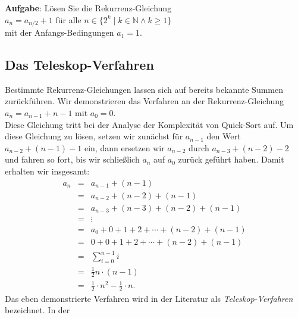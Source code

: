 \noindent
\textbf{Aufgabe}:  Lösen Sie die Rekurrenz-Gleichung \\[0.2cm]
\hspace*{1.3cm} $a_{n} = a_{n/2} + 1$ \quad für alle $n \in \{ 2^k \mid k \in \mathbb{N} \wedge k \geq 1\}$\\[0.2cm]
mit der Anfangs-Bedingungen $a_1 = 1$.
\vspace*{0.3cm}


\subsection{Das Teleskop-Verfahren}
Bestimmte Rekurrenz-Gleichungen lassen sich auf bereits bekannte Summen zurückführen.  Wir demonstrieren
das Verfahren an der Rekurrenz-Gleichung \\[0.2cm]
\hspace*{1.3cm} $a_n = a_{n-1} + n - 1$ \quad mit $a_0 = 0$. 
\\[0.2cm]
Diese Gleichung tritt bei der Analyse der Komplexität von Quick-Sort auf.
Um diese Gleichung zu lösen, setzen wir zunächst für $a_{n-1}$ den Wert $a_{n-2} + (n-1) - 1$ ein, dann 
ersetzen wir $a_{n-2}$ durch $a_{n-3} + (n-2) -2$ und fahren so fort, bis wir schließlich $a_n$ auf $a_0$
zurück geführt haben.
Damit erhalten wir insgesamt:
\[
\begin{array}{lcl}
  a_n & = & a_{n-1} + (n-1) \\
      & = & a_{n-2} + (n-2) + (n-1) \\
      & = & a_{n-3} + (n-3) + (n-2) + (n-1) \\
      & = & \vdots \\
      & = & a_{0} + 0 + 1 + 2 + \cdots  + (n-2) + (n-1) \\
      & = & 0 + 0 + 1 + 2 + \cdots  + (n-2) + (n-1) \\
      & = & \sum\limits_{i=0}^{n-1} i  \\[0.4cm]
      & = &  \frac{1}{2} n \cdot(n - 1) \\[0.2cm]
      & = & \frac{1}{2} \cdot n^2 - \frac{1}{2} \cdot n.
\end{array}
\]
Das eben demonstrierte Verfahren wird in der Literatur als \emph{Teleskop-Verfahren} bezeichnet.  In der
